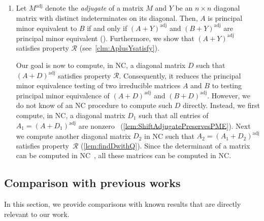 \documentclass[11pt,letterpaper]{article}
\DeclareMathOperator{\ad}{adj}
\newcommand{\adj}[1]{(#1)^{\ad}}
\newcommand{\prop}{\mathcal{R}}
\begin{document}
{{{\begin{enumerate}
     \item Let $M^{\mathrm{adj}}$ denote the \emph{adjugate} of a matrix $M$ and $Y$ be an $n\times n$ diagonal matrix with distinct indeterminates on its diagonal. Then, $A$ is principal minor equivalent to $B$ if and only if $\adj{A+Y}$ and $\adj{B+Y}$ are principal minor equivalent (\cite[Lemma~4]{Hartfiell84}). Furthermore, we show that $\adj{A+Y}$ satisfies property $\prop$ (see~\cref{clm:AplusYsatisfy}). 

    Our goal is now to compute, in NC, a diagonal matrix $D$ such that $\adj{A+D}$ satisfies property $\prop$. Consequently, it reduces the principal minor equivalence testing of two irreducible matrices $A$ and $B$ to testing principal minor equivalence of $\adj{A+D}$ and $\adj{B+D}$. However, we do not know of an NC procedure to compute such $D$ directly. Instead, we first compute, in NC, a diagonal matrix $D_1$ such that all entries of  $A_1 = \adj{A+D_1}$ are nonzero ~(\cref{lem:ShiftAdjugatePreservesPME}). Next we compute another diagonal matrix $D_2$ in NC such that $A_2 = \adj{A_1+D_2}$ satisfies property~$\prop$ (\cref{lem:findDwithQ}). %
    Since the determinant of a matrix can be computed in NC~\cite{Csanky76, Borodin83}, all these matrices can be computed in NC. 
\end{enumerate} 
\subsection{Comparison with previous works} \label{sec:comparison}
In this section, we provide comparisons with known results that are directly relevant to our work. 

}}}
\end{document}
